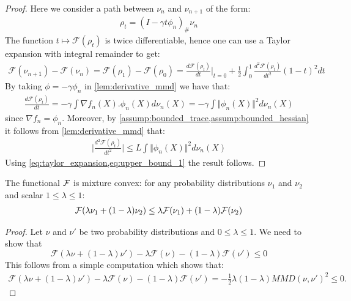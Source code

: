 \begin{proof}
	
	Here we consider a path between $\nu_n$ and $\nu_{n+1}$ of the form:
	\begin{align*}
	\rho_t	=(I-\gamma t\phi_n)_{\#}\nu_n
	\end{align*}
	The function $t\mapsto \mathcal{F}(\rho_t)$ is twice differentiable, hence one can use a Taylor expansion with integral remainder to get:
	\begin{align}\label{eq:taylor_expansion}
	\mathcal{F}(\nu_{n+1})-\mathcal{F}(\nu_{n})=\mathcal{F}(\rho_1)-\mathcal{F}(\rho_0) = \frac{d \mathcal{F}(\rho_t) }{dt}\vert_{t=0}+ \frac{1}{2} \int_0^1 \frac{d^2 \mathcal{F}(\rho_t)}{dt^2}(1-t)^2 dt 
	\end{align} 
	By taking $\phi=-\gamma \phi_n$ in \cref{lem:derivative_mmd} we have that:
	\begin{align*}
	\frac{d \mathcal{F}(\rho_t) }{dt} = -\gamma \int \nabla f_n(X).\phi_n(X)d\nu_n(X)=-\gamma \int \Vert \phi_n(X) \Vert^2 d\nu_n(X)
	\end{align*}
	since $\nabla f_n=\phi_n$.
	Moreover, by \cref{assump:bounded_trace,assump:bounded_hessian} it follows from \cref{lem:derivative_mmd} that:
	\begin{align}\label{eq:upper_bound_1}
	\vert \frac{d^2 \mathcal{F}(\rho_t) }{dt^2}   \vert\leq L\int \Vert \phi_n(X) \Vert^2 d\nu_n(X)
	\end{align}
	Using \cref{eq:taylor_expansion,eq:upper_bound_1} the result follows.
\end{proof}

\vspace*{1cm}

\begin{lemma}\label{lem:mixture_convexity}
	The functional ${{\mathcal F}}$ is mixture convex: for any probability distributions $\nu_1$ and $\nu_2$ and scalar $1\leq \lambda\leq 1$:
	\begin{align*}
	{{\mathcal F}}(\lambda \nu_1+(1-\lambda)\nu_2)\leq \lambda {{\mathcal F}}(\nu_1)+ (1-\lambda){{\mathcal F}}(\nu_2)
	\end{align*}
\end{lemma}
\begin{proof}
	Let $\nu$ and $\nu'$ be two probability distributions and $0\leq \lambda\leq 1$.
	We need to show that \[\mathcal{F}(\lambda \nu + (1-\lambda)\nu') -\lambda \mathcal{F}(\nu) -(1-\lambda)\mathcal{F}(\nu')\leq 0\]
	This follows from a simple computation which shows that:
	\begin{align*}
	\mathcal{F}(\lambda \nu + (1-\lambda)\nu') -\lambda \mathcal{F}(\nu) -(1-\lambda)\mathcal{F}(\nu') = -\frac{1}{2}\lambda(1-\lambda)MMD(\nu,\nu')^2 \leq 0.
	\end{align*}
\end{proof}


